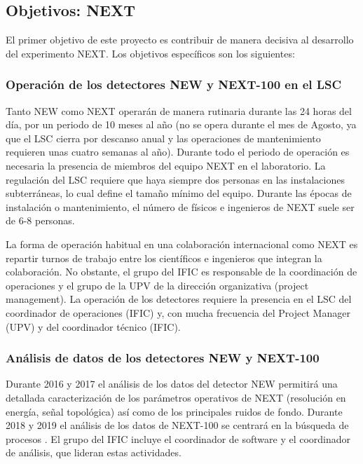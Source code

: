 \subsection*{Objetivos: NEXT}

El primer objetivo de este proyecto es contribuir de manera decisiva al desarrollo del experimento NEXT. Los objetivos específicos son los siguientes:

\subsubsection*{Operación de los detectores NEW y NEXT-100 en el LSC}

Tanto NEW como NEXT operarán de manera rutinaria durante las 24 horas del día, por un periodo de 10 meses al año (no se opera durante el mes de Agosto, ya que el LSC cierra por descanso anual y las operaciones de mantenimiento requieren unas cuatro semanas al año). Durante todo el periodo de operación es necesaria la presencia de miembros del equipo NEXT en el laboratorio. La regulación del LSC requiere que haya siempre dos personas en las instalaciones subterráneas, lo cual define el tamaño mínimo del equipo. Durante las épocas de instalación o mantenimiento, el número de físicos e ingenieros de NEXT suele ser de 6-8 personas.

La forma de operación habitual en una colaboración internacional como NEXT es repartir turnos de trabajo entre los científicos e ingenieros que integran la colaboración. No obstante, el grupo del IFIC es responsable de la coordinación de operaciones y el grupo de la UPV de la dirección organizativa (project management). La operación de los detectores requiere la presencia en el LSC del coordinador de operaciones (IFIC) y, con mucha frecuencia del Project Manager (UPV) y del coordinador técnico (IFIC). 

\subsubsection*{Análisis de datos de los detectores NEW y NEXT-100} 

Durante 2016 y 2017 el análisis de los datos del detector NEW permitirá una detallada caracterización de los parámetros operativos de NEXT (resolución en energía, señal topológica) así como de los principales ruidos de fondo. Durante 2018 y 2019 el análisis de los datos de NEXT-100 se centrará en la búsqueda de procesos \bbonu. El grupo del IFIC incluye el coordinador de software y el coordinador de análisis, que lideran estas actividades. 

